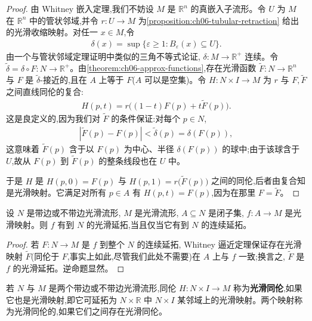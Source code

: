 \documentclass[../../main.tex]{subfiles}
\begin{document}
\begin{proof}
由 Whitney 嵌入定理,我们不妨设 $M$ 是 $\mathbb{R}^n$ 的真嵌入子流形。令 $U$ 为 $M$ 在 $\mathbb{R}^n$ 中的管状邻域,并令 $r:U\to M$ 为\cref{proposition:ch06-tubular-retraction} 给出的光滑收缩映射。对任一 $x\in M$,令
\begin{align}\label{align:ch06-delta-tube}
\delta(x)=\sup\{\varepsilon\geqslant 1:B_\varepsilon(x)\subseteq U\}.
\end{align}
由一个与管状邻域定理证明中类似的三角不等式论证, $\delta:M\to\mathbb{R}^+$ 连续。令 $\widetilde{\delta}=\delta\circ F:N\to\mathbb{R}^+$。由\cref{theorem:ch06-approx-functions},存在光滑函数 $\widetilde{F}:N\to\mathbb{R}^n$ 与 $F$ 是 $\widetilde{\delta}$-接近的,且在 $A$ 上等于 $F$($A$ 可以是空集)。令 $H:N\times I\to M$ 为 $r$ 与 $F,\widetilde{F}$ 之间直线同伦的复合:
\begin{align*}
H(p,t)=r\bigl((1-t)F(p)+t\widetilde{F}(p)\bigr).
\end{align*}
这是良定义的,因为我们对 $\widetilde{F}$ 的条件保证:对每个 $p\in N$,
\begin{align*}
|\widetilde{F}(p)-F(p)|<\widetilde{\delta}(p)=\delta(F(p)),
\end{align*}
这意味着 $\widetilde{F}(p)$ 含于以 $F(p)$ 为中心、半径 $\delta(F(p))$ 的球中;由于该球含于 $U$,故从 $F(p)$ 到 $\widetilde{F}(p)$ 的整条线段也在 $U$ 中。

于是 $H$ 是 $H(p,0)=F(p)$ 与 $H(p,1)=r\bigl(\widetilde{F}(p)\bigr)$ 之间的同伦,后者由复合知是光滑映射。它满足对所有 $p\in A$ 有 $H(p,t)=F(p)$,因为在那里 $F=\widetilde{F}$。
\end{proof}

\begin{corollary}\label{corollary:ch06-extension-maps}
设 $N$ 是带边或不带边光滑流形, $M$ 是光滑流形, $A\subseteq N$ 是闭子集, $f:A\to M$ 是光滑映射。则 $f$ 有到 $N$ 的光滑延拓,当且仅当它有到 $N$ 的连续延拓。
\end{corollary}

\begin{proof}
若 $F:N\to M$ 是 $f$ 到整个 $N$ 的连续延拓, Whitney 逼近定理保证存在光滑映射 $\widetilde{F}$(同伦于 $F$,事实上如此,尽管我们此处不需要)在 $A$ 上与 $f$ 一致;换言之, $\widetilde{F}$ 是 $f$ 的光滑延拓。逆命题显然。
\end{proof}

若 $N$ 与 $M$ 是两个带边或不带边光滑流形,同伦 $H:N\times I\to M$ 称为\textbf{光滑同伦},如果它也是光滑映射,即它可延拓为 $N\times\mathbb{R}$ 中 $N\times I$ 某邻域上的光滑映射。两个映射称为光滑同伦的,如果它们之间存在光滑同伦。
\end{document}
